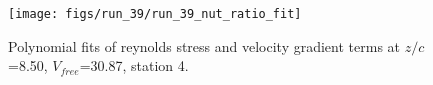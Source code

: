 \begin{figure}[H]
\centering
\texttt{[image: figs/run\_39/run\_39\_nut\_ratio\_fit]}
\caption{Polynomial fits of reynolds stress and velocity gradient terms at $z/c$=8.50, $V_{free}$=30.87, station 4.}
\label{fig:run_39_nut_ratio_fit}
\end{figure}


